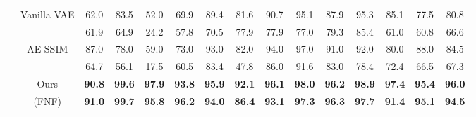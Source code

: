 \begin{table*}[htbp]
{\begin{tabular}{ccccccccccccccc}
& \multirow{2}[2]{*}{Vanilla VAE\cite{VanillaVAE}} & 
\cellcolor{green!5} 62.0    & \cellcolor{green!5} 83.5  & \cellcolor{green!5} 52.0    & \cellcolor{green!5} 69.9  & \cellcolor{green!5} 89.4  & \cellcolor{green!5} 81.6  & \cellcolor{green!5} 90.7  & \cellcolor{green!5} 95.1  & \cellcolor{green!5} 87.9  & \cellcolor{green!5} 95.3  & \cellcolor{green!5} 85.1  & \cellcolor{green!5} 77.5  & \cellcolor{green!5} 80.8 \\
& \multicolumn{1}{c}{} & 
\cellcolor{blue!5} 61.9  & \cellcolor{blue!5} 64.9  & \cellcolor{blue!5} 24.2  & \cellcolor{blue!5} 57.8  & \cellcolor{blue!5} 70.5  & \cellcolor{blue!5} 77.9  & \cellcolor{blue!5} 77.9  & \cellcolor{blue!5} 77.0    & \cellcolor{blue!5} 79.3  & \cellcolor{blue!5} 85.4  & \cellcolor{blue!5} 61.0    & \cellcolor{blue!5} 60.8  & \cellcolor{blue!5} 66.6 \\
\cmidrule{2-15}          

& \multirow{2}[2]{*}{AE-SSIM\cite{AE-SSIM}} & 
\cellcolor{green!5} 87.0    & \cellcolor{green!5} 78.0    & \cellcolor{green!5} 59.0    & \cellcolor{green!5} 73.0    & \cellcolor{green!5} 93.0    & \cellcolor{green!5} 82.0    & \cellcolor{green!5} 94.0    & \cellcolor{green!5} 97.0    & \cellcolor{green!5} 91.0    & \cellcolor{green!5} 92.0    & \cellcolor{green!5} 80.0    & \cellcolor{green!5} 88.0    & \cellcolor{green!5} 84.5 \\
& \multicolumn{1}{c}{} & 
\cellcolor{blue!5} 64.7  & \cellcolor{blue!5} 56.1  & \cellcolor{blue!5} 17.5  & \cellcolor{blue!5} 60.5  & \cellcolor{blue!5} 83.4  & \cellcolor{blue!5} 47.8  & \cellcolor{blue!5} 86.0    & \cellcolor{blue!5} 91.6  & \cellcolor{blue!5} 83.0    & \cellcolor{blue!5} 78.4  & \cellcolor{blue!5} 72.4  & \cellcolor{blue!5} 66.5  & \cellcolor{blue!5} 67.3 \\
\cmidrule{2-15} \multicolumn{1}{c}{\multirow{2}[2]{*}{}} 

& Ours  & 
\cellcolor{green!5} \textbf{90.8}  & \cellcolor{green!5} \textbf{99.6} & \cellcolor{green!5} \textbf{97.9} & \cellcolor{green!5} \textbf{93.8}  & \cellcolor{green!5} \textbf{95.9}  & \cellcolor{green!5} \textbf{92.1}  & \cellcolor{green!5} \textbf{96.1}  & \cellcolor{green!5} \textbf{98.0} & \cellcolor{green!5} \textbf{96.2}  & \cellcolor{green!5} \textbf{98.9} & \cellcolor{green!5} \textbf{97.4}  &  \cellcolor{green!5} \textbf{95.4}  & \cellcolor{green!5} \textbf{96.0} \\
& (FNF) & 
\cellcolor{blue!5} \textbf{91.0}    & \cellcolor{blue!5} \textbf{99.7} & \cellcolor{blue!5} \textbf{95.8}  & \cellcolor{blue!5} \textbf{96.2}  & \cellcolor{blue!5} \textbf{94.0} & \cellcolor{blue!5} \textbf{86.4}  & \cellcolor{blue!5} \textbf{93.1}  & \cellcolor{blue!5} \textbf{97.3}  & \cellcolor{blue!5} \textbf{96.3} & \cellcolor{blue!5} \textbf{97.7}  & \cellcolor{blue!5} \textbf{91.4}  & \cellcolor{blue!5} \textbf{95.1}  & \cellcolor{blue!5} \textbf{94.5} \\
\midrule


\end{tabular}}
\end{table*}
